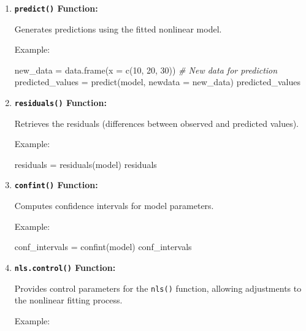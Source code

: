 \documentclass[
]{article}
\newenvironment{Shaded}{}{}
\newcommand{\AttributeTok}[1]{\textcolor[rgb]{0.49,0.56,0.16}{#1}}
\newcommand{\CommentTok}[1]{\textcolor[rgb]{0.38,0.63,0.69}{\textit{#1}}}
\newcommand{\DecValTok}[1]{\textcolor[rgb]{0.25,0.63,0.44}{#1}}
\newcommand{\FunctionTok}[1]{\textcolor[rgb]{0.02,0.16,0.49}{#1}}
\newcommand{\NormalTok}[1]{#1}
\newcommand{\OtherTok}[1]{\textcolor[rgb]{0.00,0.44,0.13}{#1}}
\begin{document}
\begin{enumerate}
\def\labelenumi{\arabic{enumi}.}
\item
  \textbf{\texttt{predict()} Function:}

  Generates predictions using the fitted nonlinear model.

  Example:

\begin{Shaded}
\begin{Highlighting}[]
\NormalTok{new\_data }\OtherTok{=} \FunctionTok{data.frame}\NormalTok{(}\AttributeTok{x =} \FunctionTok{c}\NormalTok{(}\DecValTok{10}\NormalTok{, }\DecValTok{20}\NormalTok{, }\DecValTok{30}\NormalTok{))  }\CommentTok{\# New data for prediction}
\NormalTok{predicted\_values }\OtherTok{=} \FunctionTok{predict}\NormalTok{(model, }\AttributeTok{newdata =}\NormalTok{ new\_data)}
\NormalTok{predicted\_values}
\end{Highlighting}
\end{Shaded}
\item
  \textbf{\texttt{residuals()} Function:}

  Retrieves the residuals (differences between observed and predicted
  values).

  Example:

\begin{Shaded}
\begin{Highlighting}[]
\NormalTok{residuals }\OtherTok{=} \FunctionTok{residuals}\NormalTok{(model)}
\NormalTok{residuals}
\end{Highlighting}
\end{Shaded}
\item
  \textbf{\texttt{confint()} Function:}

  Computes confidence intervals for model parameters.

  Example:

\begin{Shaded}
\begin{Highlighting}[]
\NormalTok{conf\_intervals }\OtherTok{=} \FunctionTok{confint}\NormalTok{(model)}
\NormalTok{conf\_intervals}
\end{Highlighting}
\end{Shaded}
\item
  \textbf{\texttt{nls.control()} Function:}

  Provides control parameters for the \texttt{nls()} function, allowing
  adjustments to the nonlinear fitting process.

  Example:


\end{enumerate}
\end{document}
